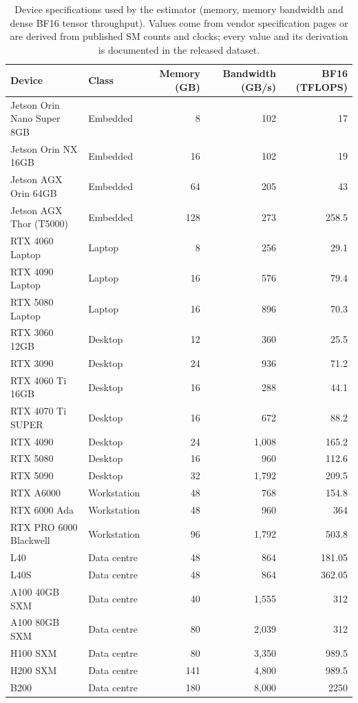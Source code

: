 \begin{table}[H]
\caption{Device specifications used by the estimator (memory, memory bandwidth and dense BF16 tensor throughput). Values come from vendor specification pages or are derived from published SM counts and clocks; every value and its derivation is documented in the released dataset.\label{tab:devices}}
\small
\begin{tabularx}{\textwidth}{@{}X l r r r@{}}
\toprule
\textbf{Device} & \textbf{Class} & \textbf{Memory (GB)} & \textbf{Bandwidth (GB/s)} & \textbf{BF16 (TFLOPS)}\\
\midrule
Jetson Orin Nano Super 8GB & Embedded & 8 & 102 & 17\\
Jetson Orin NX 16GB & Embedded & 16 & 102 & 19\\
Jetson AGX Orin 64GB & Embedded & 64 & 205 & 43\\
Jetson AGX Thor (T5000) & Embedded & 128 & 273 & 258.5\\
RTX 4060 Laptop & Laptop & 8 & 256 & 29.1\\
RTX 4090 Laptop & Laptop & 16 & 576 & 79.4\\
RTX 5080 Laptop & Laptop & 16 & 896 & 70.3\\
RTX 3060 12GB & Desktop & 12 & 360 & 25.5\\
RTX 3090 & Desktop & 24 & 936 & 71.2\\
RTX 4060 Ti 16GB & Desktop & 16 & 288 & 44.1\\
RTX 4070 Ti SUPER & Desktop & 16 & 672 & 88.2\\
RTX 4090 & Desktop & 24 & 1,008 & 165.2\\
RTX 5080 & Desktop & 16 & 960 & 112.6\\
RTX 5090 & Desktop & 32 & 1,792 & 209.5\\
RTX A6000 & Workstation & 48 & 768 & 154.8\\
RTX 6000 Ada & Workstation & 48 & 960 & 364\\
RTX PRO 6000 Blackwell & Workstation & 96 & 1,792 & 503.8\\
L40 & Data centre & 48 & 864 & 181.05\\
L40S & Data centre & 48 & 864 & 362.05\\
A100 40GB SXM & Data centre & 40 & 1,555 & 312\\
A100 80GB SXM & Data centre & 80 & 2,039 & 312\\
H100 SXM & Data centre & 80 & 3,350 & 989.5\\
H200 SXM & Data centre & 141 & 4,800 & 989.5\\
B200 & Data centre & 180 & 8,000 & 2250\\
\bottomrule
\end{tabularx}
\end{table}

